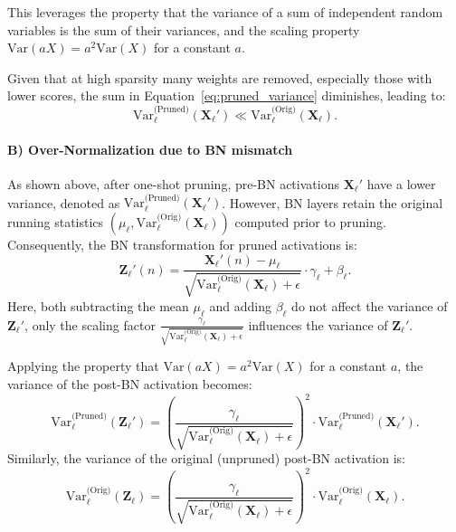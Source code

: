 This leverages the property that the variance of a sum of independent random variables is the sum of their variances, and the scaling property \(\mathrm{Var}(aX) = a^2 \mathrm{Var}(X)\) for a constant \(a\).

Given that at high sparsity many weights are removed, especially those with lower scores, the sum in Equation~\ref{eq:pruned_variance} diminishes, leading to:
\begin{equation}
    \mathrm{Var}_\ell^{\text{(Pruned)}}(\mathbf{X}_\ell') \ll \mathrm{Var}_\ell^{\text{(Orig)}}(\mathbf{X}_\ell).
    \label{eq:variance_reduction}
\end{equation}

\paragraph{B) Over-Normalization due to BN mismatch}

As shown above, after one-shot pruning, pre-BN activations \(\mathbf{X}_\ell'\) have a lower variance, denoted as \(\mathrm{Var}_\ell^{\text{(Pruned)}}(\mathbf{X}_\ell')\). However, BN layers retain the original running statistics \((\mu_\ell, \mathrm{Var}_\ell^{\text{(Orig)}}(\mathbf{X}_\ell))\) computed prior to pruning. Consequently, the BN transformation for pruned activations is:
\begin{equation}
    \mathbf{Z}_\ell'(n) = 
    \frac{\mathbf{X}_\ell'(n) - \mu_\ell}
    {\sqrt{\mathrm{Var}_\ell^{\text{(Orig)}}(\mathbf{X}_\ell) + \epsilon}} \cdot \gamma_\ell + \beta_\ell.
    \label{eq:pruned_bn_variance}
\end{equation}
Here, both subtracting the mean \(\mu_\ell\) and adding  \(\beta_\ell\) do not affect the variance of $\mathbf{Z}_\ell'$, only the scaling factor \(\frac{\gamma_\ell}{\sqrt{\mathrm{Var}_\ell^{\text{(Orig)}}(\mathbf{X}_\ell) + \epsilon}}\) influences the variance of \(\mathbf{Z}_\ell'\).

Applying the property that \(\mathrm{Var}(aX) = a^2 \mathrm{Var}(X)\) for a constant \(a\), the variance of the post-BN activation becomes:
\begin{equation}
    \mathrm{Var}_\ell^{\text{(Pruned)}}(\mathbf{Z}_\ell') = \left( \frac{\gamma_\ell}{\sqrt{\mathrm{Var}_\ell^{\text{(Orig)}}(\mathbf{X}_\ell) + \epsilon}} \right)^2 \cdot \mathrm{Var}_\ell^{\text{(Pruned)}}(\mathbf{X}_\ell').
    \label{eq:var_z_pruned}
\end{equation}
Similarly, the variance of the original (unpruned) post-BN activation is:
\begin{equation}
    \mathrm{Var}_\ell^{\text{(Orig)}}(\mathbf{Z}_\ell) = \left( \frac{\gamma_\ell}{\sqrt{\mathrm{Var}_\ell^{\text{(Orig)}}(\mathbf{X}_\ell) + \epsilon}} \right)^2 \cdot \mathrm{Var}_\ell^{\text{(Orig)}}(\mathbf{X}_\ell).
    \label{eq:var_z_orig}
\end{equation}

